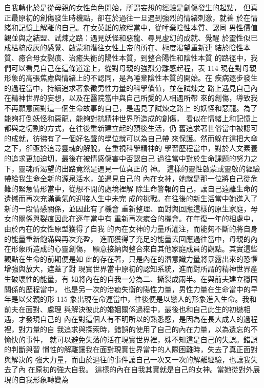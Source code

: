 自我轉化於是從母親的女性角色開始，所謂妄想的經驗是創傷發生的起點，
但真正最原初的創傷發生時機點，卻在於過往一旦遇到強烈的情緒刺激，就善
於在情緒和記憶上解離的自己。在女英雄的旅程當中，從唾棄陰性本質、認同
男性價值觀並與之結盟、試煉之路：遇見妖怪和惡龍、尋見虛幻的成就、覺醒
於靈性似已成枯槁成灰的感覺、啟蒙和潛往女性上帝的所在、極度渴望重新連
結於陰性本質、癒合母女裂痕、治癒失衡的陽性本質，到整合陽性和陰性本質
的路徑中，我們可以看見自己在這條道途上，從對母親的強烈分離感起程，表
114 
現在對母親形象的高張焦慮與情緒上的不認同，是為唾棄陰性本質的開始。在
疾病逐步發生的過程當中，持續追求著象徵男性力量的科學價值，並在試煉之
路上遇見自己內在精神世界的妄想，以及在醫院當中與自己所愛的人相遇所帶
來的創傷，導致我不再願意面對這一個生命故事的自己，是遇見了試煉之路上
的妖怪和惡龍。為了能夠打倒妖怪和惡龍，能夠對抗精神世界所造成的創傷，
看似在情緒上和記憶上都與之切割的方式，在往後重新建立起的預後生活，仍
舊追求著世俗當中被認可的成就，彷彿有了一個好名聲的學位就可以為自己帶
來保護。然而躲在這把大傘之下，卻亟於追尋靈魂的解脫，在重視科學精神的
學習歷程當中，對於人文素養的追求更加迫切，最後在被情感傷害中否認自己
過往當中對於生命課題的努力之下，靈魂所渴望的出路竟然是遇見一位真正的
神。 
這樣的靈性啟蒙或靈啟的經驗帶給我生命全新的源泉活水，並遇見自己的
內在女神，她就是那一位將自己從危難的緊急情形當中，從想不開的處境裡解
除生命警報的自己，讓自己遠離生命的遺憾而再次充滿勇氣的迎接人生中未完
成的挑戰。在往後的新生活當中她進入了新的一段情感關係，並因此有了機會
重新整理、面對與回應這樣的原生家庭，母女的關係與裂痕因此在逐年當中有
重新再次癒合的機會。在年復一年的相處中，由於內在的女性原型獲得了自我
的內在女神的力量所灌注，而能夠不斷的將自身的能量重新飽滿與再次充盈，
進而獲得了充足的能量去回應過往當中，母親的內在形象所造成的心靈創傷，
願意接納與整合來自其他家庭成員的觀點。其實這些觀點在生命的前期便是如
此的存在著，只是內在的潛意識力量將暴露出來的恐懼增強與放大，遮蓋了對
現實世界當中原初的認知系統，進而對所謂的精神世界產生破壞性的能量，有
如將內在的自我一分為二、撕裂成兩半。在與前夫建立穩固關係的歷程當中，
也是另一次的治癒失衡的陽性力量，男性力量在生命當中的早年是以父親的形
115 
象出現在命運當中，往後便是以戀人的形象進入生命。我和前夫在面對、處理
與解決彼此的婚姻關係過程中，最後也和自己此生的初戀相遇，才發現自己的
內在對這個人有不明所以的熟悉感，是因為在長大成人的過程裡，對力量的自
我追求與探索時，錯誤的使用了自己的內在力量，以為遺忘的不愉快的事件，
就可以避免失落的活在現實世界裡，殊不知這是自己的失誤。錯誤的判斷與習
慣性的解離讓我在面對現實世界當中的人際困難時，失去了真正面對與解決的
強大力量，而由於過往的事件讓自己一次又一次的解離經驗，也讓我失去了內
在原初的強大自我。 
這樣的內在自我其實就是自己的女神。當她從對外展現的自我形象轉變為
